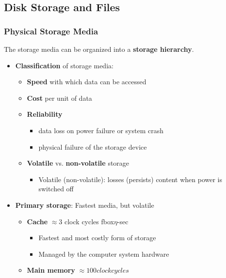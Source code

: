 \subsection{Disk Storage and Files}


\subsubsection{Physical Storage Media}

The storage media can be organized into a \textbf{storage hierarchy}.
\begin{itemize}[label=\(\rhd\)]
    \item \textbf{Classification} of storage media:
    \begin{itemize}[label=\(\rhd\)]
        \item \textbf{Speed} with which data can be accessed
        \item \textbf{Cost} per unit of data
        \item \textbf{Reliability}
        \begin{itemize}[label=\(\rhd\)]
            \item data loss on power failure or system crash
            \item physical failure of the storage device
        \end{itemize}
        \item \textbf{Volatile} vs. \textbf{non-volatile} storage
        \begin{itemize}[label=\(\rhd\)]
            \item Volatile (non-volatile): losses (persists) content when power is switched off
        \end{itemize}
    \end{itemize}
    \item \textbf{Primary storage}: Fastest media, but volatile
        \begin{itemize}[label=\(\rhd\)]
            \item \textbf{Cache} $\approx 3$ clock cycles fbox{$\eta$-sec}
            \begin{itemize}[label=\(\rhd\)]
                \item Fastest and most costly form of storage
                \item Managed by the computer system hardware
            \end{itemize}
            \item \textbf{Main memory} $\approx 100 clock cycles$ 

\end{itemize}
\end{itemize}
